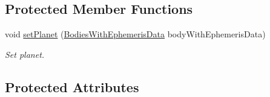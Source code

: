 \subsection*{Protected Member Functions}
\begin{DoxyCompactItemize}
\item 
void \hyperlink{classtudat_1_1ephemerides_1_1ApproximatePlanetPositionsBase_aec3603d568cec958c2aef70100645c1b}{set\+Planet} (\hyperlink{classtudat_1_1ephemerides_1_1ApproximatePlanetPositionsBase_aa698885dcabac2815a6205d5502724d2}{Bodies\+With\+Ephemeris\+Data} body\+With\+Ephemeris\+Data)
\begin{DoxyCompactList}\small\item\em Set planet. \end{DoxyCompactList}\end{DoxyCompactItemize}
\subsection*{Protected Attributes}
